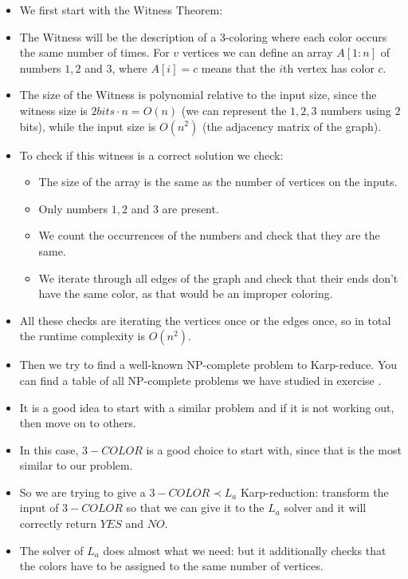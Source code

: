 \begin{itemize}
    \item We first start with the Witness Theorem:
    \item The Witness will be the description of a $3$-coloring where each color occurs the same number of times. For $v$ vertices we can define an array $A[1:n]$ of numbers $1,2$ and $3$, where $A[i] = c$ means that the $i$th vertex has color $c$.
    \item The size of the Witness is polynomial relative to the input size, since the witness size is $2 bits \cdot{} n = O(n)$ (we can represent the $1,2,3$ numbers using $2$ bits), while the input size is $O(n^2)$ (the adjacency matrix of the graph).
    \item To check if this witness is a correct solution we check:
    \begin{itemize}
        \item The size of the array is the same as the number of vertices on the inputs.
        \item Only numbers $1,2$ and $3$ are present.
        \item We count the occurrences of the numbers and check that they are the same.
        \item We iterate through all edges of the graph and check that their ends don't have the same color, as that would be an improper coloring.
    \end{itemize}
    \item All these checks are iterating the vertices once or the edges once, so in total the runtime complexity is $O(n^2)$.
    \item Then we try to find a well-known NP-complete problem to Karp-reduce. You can find a table of all NP-complete problems we have studied in exercise .
    \item It is a good idea to start with a similar problem and if it is not working out, then move on to others.
    \item In this case, $3-COLOR$ is a good choice to start with, since that is the most similar to our problem.
    \item So we are trying to give a $3-COLOR \prec L_a$ Karp-reduction: transform the input of $3-COLOR$ so that we can give it to the $L_a$ solver and it will correctly return $YES$ and $NO$.
    \item The solver of $L_a$ does almost what we need: but it additionally checks that the colors have to be assigned to the same number of vertices.

\end{itemize}
